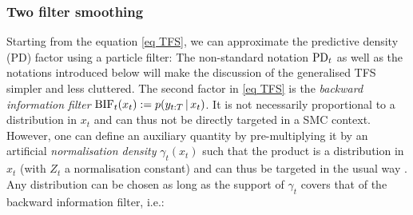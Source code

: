 \subsubsection{\label{introTFS}Two filter smoothing}
Starting from the equation \eqref{eq TFS}, we can approximate the predictive density (PD) factor using a particle filter:%
%
%
The non-standard notation $\text{PD}_{t}$ as well as the notations introduced below will make the discussion of the generalised TFS simpler and less cluttered. The second factor in \eqref{eq TFS} is the \emph{backward information filter} $\text{BIF}_t(x_t):=p(y_{t:T}\,|\, x_{t})$. It is not necessarily proportional to a distribution in $x_{t}$ and can thus not be directly targeted in a SMC context. However, one can define an auxiliary quantity by pre-multiplying it by an artificial \emph{normalisation density} $\gamma_{t}(x_{t})$ such that the product
%
%
is a distribution in $x_{t}$ (with $Z_{t}$ a normalisation constant) and can thus be targeted in the usual way \citep{briers10}. Any distribution can be chosen as long as the support of $\gamma_{t}$ covers that of the backward information filter, i.e.:
%
%
